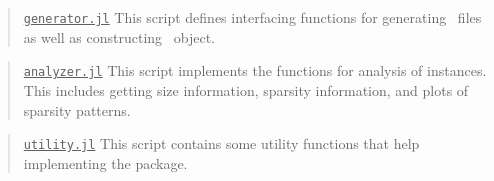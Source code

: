 \begin{quotation}
	\noindent\underline{\texttt{generator.jl}} This script defines interfacing functions for generating \smps\ files as well as constructing \jumpmodel\ object.
\end{quotation}

\begin{quotation}
	\noindent\underline{\texttt{analyzer.jl}} This script implements the functions for analysis of instances. This includes getting size information, sparsity information, and plots of sparsity patterns.
\end{quotation}

\begin{quotation}
	\noindent\underline{\texttt{utility.jl}} This script contains some utility functions that help implementing the package.
\end{quotation}



